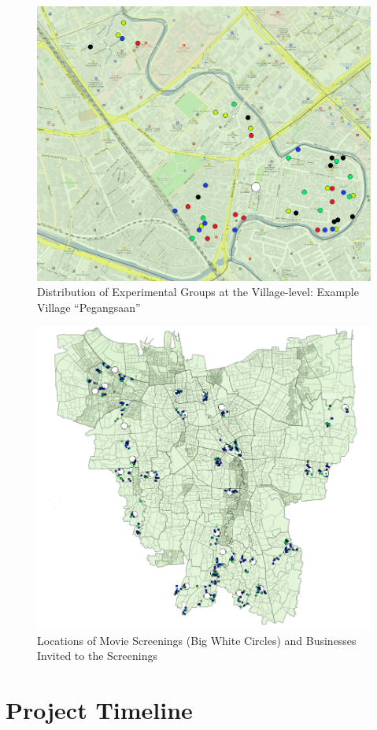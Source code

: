 \documentclass[11.5pt]{article}
\begin{document}
\begin{appendices}
\begin{landscape}
\begin{figure}[h!]
    \centering
    \caption{Distribution of Experimental Groups at the Village-level: Example Village ``Pegangsaan''}
   \includegraphics[width=120mm]{FigmapZoom.png}
\end{figure}

\pagebreak

\begin{figure}[h!]
    \centering
    \caption{Locations of Movie Screenings (Big White Circles) and Businesses Invited to the Screenings}
   	\includegraphics[width=120mm]{FigmapMovie.png}
\end{figure}

\end{landscape}
\pagebreak

\section{Project Timeline} \label{sec.timeline}

\begin{figure}[h]
    \centering
    
\end{figure}

\end{appendices}
\end{document}

